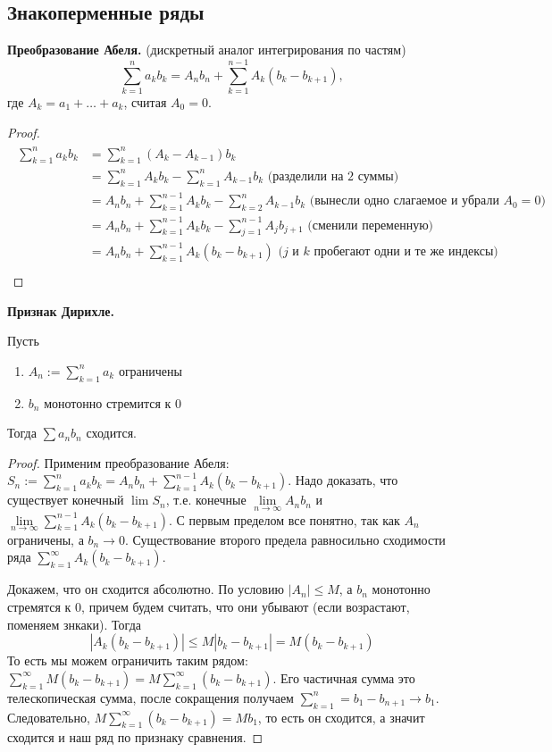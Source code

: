 \subsection{Знакоперменные ряды}
\textbf{Преобразование Абеля.} (дискретный аналог интегрирования по частям) \[ \sum_{k = 1}^n a_kb_k = A_nb_n + \sum_{k = 1}^{n - 1} A_k(b_k - b_{k+1}), \] где $A_k = a_1 + \dots + a_k$, считая $A_0 = 0$.
\begin{proof}
    \begin{gather*}
        \begin{split}
            \sum_{k = 1}^n a_kb_k &= \sum_{k = 1}^n (A_k - A_{k-1})b_k \\
            &= \sum_{k = 1}^n A_kb_k - \sum_{k = 1}^n A_{k-1}b_k \text{ (разделили на 2 суммы)} \\
            &= A_nb_n + \sum_{k = 1}^{n-1} A_kb_k - \sum_{k = 2}^n A_{k-1}b_k \text{ (вынесли одно слагаемое и убрали $A_0 = 0$)} \\
            &= A_nb_n + \sum_{k = 1}^{n-1} A_kb_k - \sum_{j = 1}^{n-1} A_jb_{j+1} \text{ (сменили переменную)} \\
            &= A_nb_n + \sum_{k = 1}^{n-1} A_k(b_k - b_{k+1}) \text{ ($j$ и $k$ пробегают одни и те же индексы)} \\
        \end{split}
    \end{gather*}
\end{proof} 

\textbf{Признак Дирихле.} 

 Пусть \begin{enumerate}
    \item $A_n := \sum\limits_{k = 1}^n a_k$ ограничены
    \item $b_n$ монотонно стремится к 0
\end{enumerate}
Тогда $\sum a_nb_n$ сходится.
\begin{proof}
    Применим преобразование Абеля: $S_n := \sum\limits_{k=1}^n a_kb_k = A_nb_n + \sum\limits_{k=1}^{n-1} A_k(b_k - b_{k+1})$.
    \quad Надо доказать, что существует конечный $\lim S_n$, т.е. конечные $\lim\limits_{n \to \infty} A_nb_n$ и $\lim\limits_{n \to \infty} \sum\limits_{k=1}^{n-1} A_k(b_k - b_{k+1})$.
    С первым пределом все понятно, так как $A_n$ ограничены, а $b_n \to 0$.
    Существование второго предела равносильно сходимости ряда $\sum\limits_{k=1}^{\infty} A_k(b_k - b_{k+1})$.

    \quad Докажем, что он сходится абсолютно. 
    По условию $|A_n| \leqslant M$, а $b_n$ монотонно стремятся к 0, причем будем считать, что они убывают (если возрастают, поменяем знкаки).
    Тогда \[ |A_k(b_k - b_{k+1})| \leqslant M|b_k - b_{k+1}| = M(b_k - b_{k+1}) \]
    \quad То есть мы можем ограничить таким рядом: $ \sum\limits_{k=1}^{\infty} M(b_k - b_{k+1}) = M\sum\limits_{k=1}^{\infty} (b_k - b_{k+1}) $. 
    Его частичная сумма это телескопическая сумма, после сокращения получаем $\sum\limits_{k=1}^{n} = b_1 - b_{n+1} \to b_1$.
    Следовательно, $M\sum\limits_{k=1}^{\infty} (b_k - b_{k+1}) = Mb_1$, то есть он сходится, а значит сходится и наш ряд по признаку сравнения.
\end{proof}

